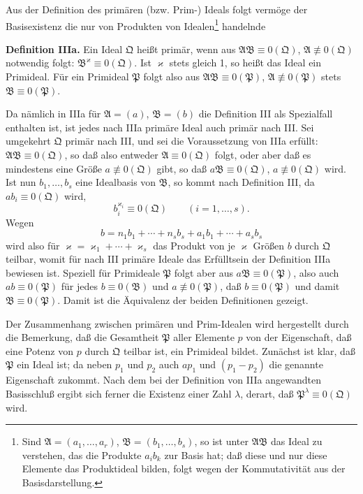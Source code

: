\documentclass[11pt]{article}
\newcommand{\ideal}[1]{\mathfrak{#1}}
\begin{document}
Aus der Definition des primären (bzw. Prim-) Ideals folgt vermöge der Basisexistenz die nur von Produkten von Idealen\footnote{Sind $\ideal A=(a_1,\ldots,a_r)$, $\ideal B=(b_1,\ldots,b_s)$, so ist unter $\ideal A\ideal B$ das Ideal zu verstehen, das die Produkte $a_i b_k$ zur Basis hat; daß diese und nur diese Elemente das Produktideal bilden, folgt wegen der Kommutativität aus der Basisdarstellung.} handelnde

\textbf{Definition IIIa.} Ein Ideal $\ideal Q$ heißt primär, wenn aus $\ideal A\ideal B\equiv0(\ideal Q)$, $\ideal A\not\equiv0(\ideal Q)$ notwendig folgt: $\ideal B^\varkappa\equiv0(\ideal Q)$. Ist $\varkappa$ stets gleich 1, so heißt das Ideal ein Primideal. Für ein Primideal $\ideal P$ folgt also aus $\ideal A\ideal B\equiv0(\ideal P)$, $\ideal A\not\equiv0(\ideal P)$ stets $\ideal B\equiv0(\ideal P)$.

Da nämlich in IIIa für $\ideal A=(a)$, $\ideal B=(b)$ die Definition III als Spezialfall enthalten ist, ist jedes nach IIIa primäre Ideal auch primär nach III. Sei umgekehrt $\ideal Q$ primär nach III, und sei die Voraussetzung von IIIa erfüllt: $\ideal A\ideal B\equiv0(\ideal Q)$, so daß also entweder $\ideal A\equiv0(\ideal Q)$ folgt, oder aber daß es mindestens eine Größe $a\not\equiv0(\ideal Q)$ gibt, so daß $a\ideal B\equiv0(\ideal Q)$, $a\not\equiv0(\ideal Q)$ wird. Ist nun $b_1,\ldots,b_s$ eine Idealbasis von $\ideal B$, so kommt nach Definition III, da $a b_i\equiv0(\ideal Q)$ wird,
\[
 b_i^{\varkappa_i}\equiv0(\ideal Q)\qquad (i=1,\ldots,s).
\]
Wegen
\[
 b=n_1b_1+\cdots+n_s b_s+a_1b_1+\cdots+a_s b_s
\]
wird also für $\varkappa=\varkappa_1+\cdots+\varkappa_s$ das Produkt von je $\varkappa$ Größen $b$ durch $\ideal Q$ teilbar, womit für nach III primäre Ideale das Erfülltsein der Definition IIIa bewiesen ist. Speziell für Primideale $\ideal P$ folgt aber aus $a\ideal B\equiv0(\ideal P)$, also auch $a b\equiv0(\ideal P)$ für jedes $b\equiv0(\ideal B)$ und $a\not\equiv0(\ideal P)$, daß $b\equiv0(\ideal P)$ und damit $\ideal B\equiv0(\ideal P)$. Damit ist die Äquivalenz der beiden Definitionen gezeigt.

Der Zusammenhang zwischen primären und Prim-Idealen wird hergestellt durch die Bemerkung, daß die Gesamtheit $\ideal P$ aller Elemente $p$ von der Eigenschaft, daß eine Potenz von $p$ durch $\ideal Q$ teilbar ist, ein Primideal bildet. Zunächst ist klar, daß $\ideal P$ ein Ideal ist; da neben $p_1$ und $p_2$ auch $a p_1$ und $(p_1-p_2)$ die genannte Eigenschaft zukommt. Nach dem bei der Definition von IIIa angewandten Basisschluß ergibt sich ferner die Existenz einer Zahl $\lambda$, derart, daß $\ideal P^\lambda\equiv0(\ideal Q)$ wird.
\end{document}

